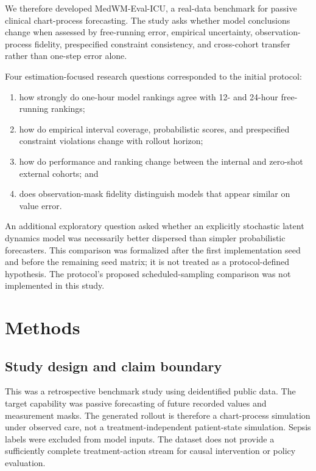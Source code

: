 \documentclass[conference]{IEEEtran}
\providecommand{\tightlist}{%
  \setlength{\itemsep}{0pt}\setlength{\parskip}{0pt}}
\begin{document}
We therefore developed MedWM-Eval-ICU, a real-data benchmark for passive
clinical chart-process forecasting. The study asks whether model conclusions
change when assessed by free-running error, empirical uncertainty,
observation-process fidelity, prespecified constraint consistency, and
cross-cohort transfer rather than one-step error alone.

Four estimation-focused research questions corresponded to the initial
protocol:

\begin{enumerate}
\def\labelenumi{\arabic{enumi}.}
\tightlist
\item
  how strongly do one-hour model rankings agree with 12- and 24-hour
  free-running rankings;
\item
  how do empirical interval coverage, probabilistic scores, and prespecified
  constraint violations change with rollout horizon;
\item
  how do performance and ranking change between the internal and zero-shot
  external cohorts; and
\item
  does observation-mask fidelity distinguish models that appear similar on
  value error.
\end{enumerate}

An additional exploratory question asked whether an explicitly stochastic
latent dynamics model was necessarily better dispersed than simpler
probabilistic forecasters. This comparison was formalized after the first
implementation seed and before the remaining seed matrix; it is not treated
as a protocol-defined hypothesis. The protocol's proposed scheduled-sampling
comparison was not implemented in this study.

\section{Methods}\label{methods}

\subsection{Study design and claim boundary}\label{study-design-and-claim-boundary}

This was a retrospective benchmark study using deidentified public data. The
target capability was passive forecasting of future recorded values and
measurement masks. The generated rollout is therefore a chart-process
simulation under observed care, not a treatment-independent patient-state
simulation. Sepsis labels were excluded from model inputs. The dataset does not
provide a sufficiently complete treatment-action stream for causal
intervention or policy evaluation.
\end{document}
